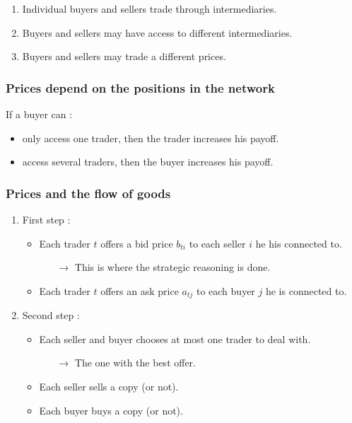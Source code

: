 \begin{enumerate}
\item Individual buyers and sellers trade through intermediaries.
\item Buyers and sellers may have access to different intermediaries.
\item Buyers and sellers may trade a different prices.
\end{enumerate}

\subsubsection{Prices depend on the positions in the network}

If a buyer can :
\begin{itemize}
\item only access one trader, then the trader increases his payoff.
\item access several traders, then the buyer increases his payoff.
\end{itemize}

\subsubsection{Prices and the flow of goods}

\begin{enumerate}
\item First step :
	\begin{itemize}
	\item Each trader $t$ offers a bid price $b_{ti}$ to each seller $i$ he his connected to.
		\begin{itemize}
		\item[$\rightarrow$] This is where the strategic reasoning is done.
		\end{itemize}
	\item Each trader $t$ offers an ask price $a_{tj}$ to each buyer $j$ he is connected to.
	\end{itemize}
\item Second step :
	\begin{itemize}
	\item Each seller and buyer chooses at most one trader to deal with.
		\begin{itemize}
		\item[$\rightarrow$] The one with the best offer.
		\end{itemize}
	\item Each seller sells a copy (or not).
	\item Each buyer buys a copy (or not).
	\end{itemize}
\end{enumerate}


